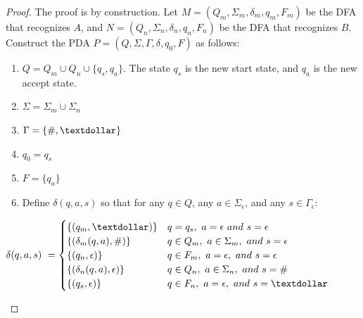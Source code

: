 \documentclass[11pt]{article}
\begin{document}
\begin{proof}
The proof is by construction. Let $M = (Q_m, \Sigma_m, \delta_m, q_m, F_m)$ be the DFA that recognizes $A$, and $N = (Q_n, \Sigma_n, \delta_n, q_n, F_n)$ be the DFA that recognizes $B$. Construct the PDA $P = (Q, \Sigma, \Gamma, \delta, q_0, F)$ as follows:
\begin{enumerate}
\item $Q = Q_m \cup Q_n \cup \{q_s, q_a\}$. The state $q_s$ is the new start state, and $q_a$ is the new accept state.
\item $\Sigma = \Sigma_m \cup \Sigma_n$
\item $\Gamma = \{\#, \textdollar\}$
\item $q_0 = q_s$
\item $F = \{q_a\}$
\item Define $\delta(q, a, s)$ so that for any $q \in Q$, any $a \in \Sigma_{\epsilon}$, and any $s \in \Gamma_{\epsilon}$:
\end{enumerate}
\begin{center}
$\displaystyle \delta(q, a, s) \ =\begin{cases}
\{ (q_m, \textdollar) \} & q = q_s, \ a = \epsilon \ and \ s = \epsilon  \\
\{ (\delta_m(q, a), \#) \} & q \in Q_m, \ a \in \Sigma_m, \ and \ s = \epsilon \\
\{ (q_n, \epsilon) \} & q \in F_m, \ a = \epsilon, \ and \ s = \epsilon \\
\{ (\delta_n(q, a), \epsilon) \} & q \in Q_n, \ a \in \Sigma_n, \ and \ s = \# \\
\{ (q_s, \epsilon) \} & q \in F_n, \ a = \epsilon, \ and \ s = \textdollar
\end{cases} \ \ $
\end{center}
\end{proof}
\end{document}
